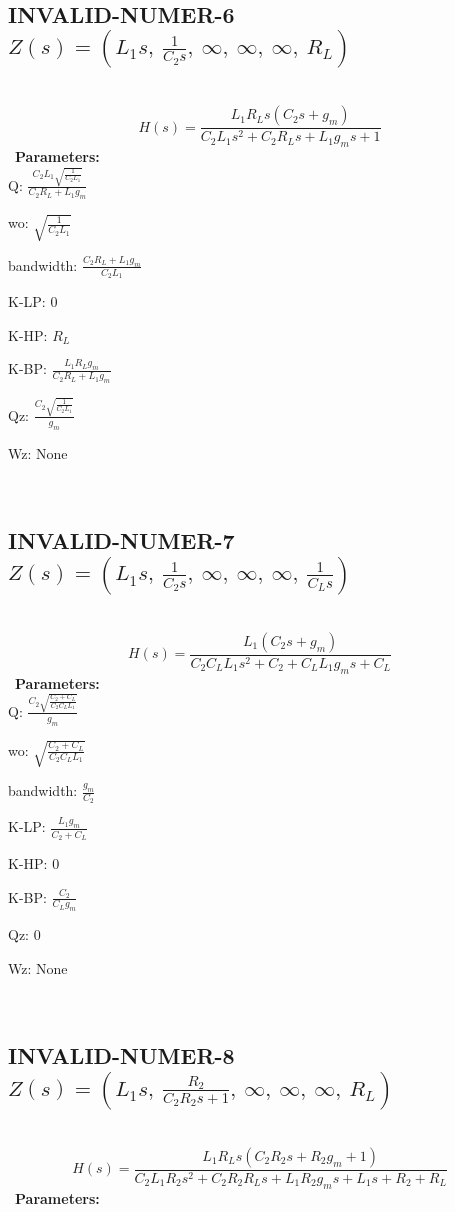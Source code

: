\documentclass{article}
\begin{document}
\ 

\subsection{INVALID-NUMER-6 $Z(s) = \left( L_{1} s, \  \frac{1}{C_{2} s}, \  \infty, \  \infty, \  \infty, \  R_{L}\right)$ } \ 
\textbf{\[H(s) = \frac{L_{1} R_{L} s \left(C_{2} s + g_{m}\right)}{C_{2} L_{1} s^{2} + C_{2} R_{L} s + L_{1} g_{m} s + 1}\] } \ 
\textbf{Parameters:}\\ 

Q: $\frac{C_{2} L_{1} \sqrt{\frac{1}{C_{2} L_{1}}}}{C_{2} R_{L} + L_{1} g_{m}}$\ 

wo: $\sqrt{\frac{1}{C_{2} L_{1}}}$\ 

bandwidth: $\frac{C_{2} R_{L} + L_{1} g_{m}}{C_{2} L_{1}}$\ 

K-LP: $0$\ 

K-HP: $R_{L}$\ 

K-BP: $\frac{L_{1} R_{L} g_{m}}{C_{2} R_{L} + L_{1} g_{m}}$\ 

Qz: $\frac{C_{2} \sqrt{\frac{1}{C_{2} L_{1}}}}{g_{m}}$\ 

Wz: $\text{None}$\ 

\ 

\subsection{INVALID-NUMER-7 $Z(s) = \left( L_{1} s, \  \frac{1}{C_{2} s}, \  \infty, \  \infty, \  \infty, \  \frac{1}{C_{L} s}\right)$ } \ 
\textbf{\[H(s) = \frac{L_{1} \left(C_{2} s + g_{m}\right)}{C_{2} C_{L} L_{1} s^{2} + C_{2} + C_{L} L_{1} g_{m} s + C_{L}}\] } \ 
\textbf{Parameters:}\\ 

Q: $\frac{C_{2} \sqrt{\frac{C_{2} + C_{L}}{C_{2} C_{L} L_{1}}}}{g_{m}}$\ 

wo: $\sqrt{\frac{C_{2} + C_{L}}{C_{2} C_{L} L_{1}}}$\ 

bandwidth: $\frac{g_{m}}{C_{2}}$\ 

K-LP: $\frac{L_{1} g_{m}}{C_{2} + C_{L}}$\ 

K-HP: $0$\ 

K-BP: $\frac{C_{2}}{C_{L} g_{m}}$\ 

Qz: $0$\ 

Wz: $\text{None}$\ 

\ 

\subsection{INVALID-NUMER-8 $Z(s) = \left( L_{1} s, \  \frac{R_{2}}{C_{2} R_{2} s + 1}, \  \infty, \  \infty, \  \infty, \  R_{L}\right)$ } \ 
\textbf{\[H(s) = \frac{L_{1} R_{L} s \left(C_{2} R_{2} s + R_{2} g_{m} + 1\right)}{C_{2} L_{1} R_{2} s^{2} + C_{2} R_{2} R_{L} s + L_{1} R_{2} g_{m} s + L_{1} s + R_{2} + R_{L}}\] } \ 
\textbf{Parameters:}\\ 
\end{document}
